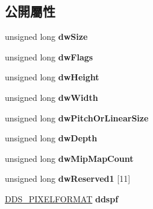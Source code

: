 \subsection*{公開屬性}
\begin{DoxyCompactItemize}
\item 
unsigned long {\bfseries dw\+Size}\hypertarget{struct_d_d_s___h_e_a_d_e_r_adcd66bcae56a4f70de87bd1a25650254}{}\label{struct_d_d_s___h_e_a_d_e_r_adcd66bcae56a4f70de87bd1a25650254}

\item 
unsigned long {\bfseries dw\+Flags}\hypertarget{struct_d_d_s___h_e_a_d_e_r_ae2e231f8e4f3b1f5968fa61dcbf1a758}{}\label{struct_d_d_s___h_e_a_d_e_r_ae2e231f8e4f3b1f5968fa61dcbf1a758}

\item 
unsigned long {\bfseries dw\+Height}\hypertarget{struct_d_d_s___h_e_a_d_e_r_a1d571cef49ca13e069ad326f63c59a3b}{}\label{struct_d_d_s___h_e_a_d_e_r_a1d571cef49ca13e069ad326f63c59a3b}

\item 
unsigned long {\bfseries dw\+Width}\hypertarget{struct_d_d_s___h_e_a_d_e_r_a6e372735f1272f0225a70a7f91234447}{}\label{struct_d_d_s___h_e_a_d_e_r_a6e372735f1272f0225a70a7f91234447}

\item 
unsigned long {\bfseries dw\+Pitch\+Or\+Linear\+Size}\hypertarget{struct_d_d_s___h_e_a_d_e_r_aafd89087e77854c55159e52714b45ba3}{}\label{struct_d_d_s___h_e_a_d_e_r_aafd89087e77854c55159e52714b45ba3}

\item 
unsigned long {\bfseries dw\+Depth}\hypertarget{struct_d_d_s___h_e_a_d_e_r_a032af0a73ed281d4558b8ce8cf0047c8}{}\label{struct_d_d_s___h_e_a_d_e_r_a032af0a73ed281d4558b8ce8cf0047c8}

\item 
unsigned long {\bfseries dw\+Mip\+Map\+Count}\hypertarget{struct_d_d_s___h_e_a_d_e_r_a73231142b63af5d8d1139439ca22ae99}{}\label{struct_d_d_s___h_e_a_d_e_r_a73231142b63af5d8d1139439ca22ae99}

\item 
unsigned long {\bfseries dw\+Reserved1} \mbox{[}11\mbox{]}\hypertarget{struct_d_d_s___h_e_a_d_e_r_a1b8a27ee32638d9ff7cf1c11cecd7201}{}\label{struct_d_d_s___h_e_a_d_e_r_a1b8a27ee32638d9ff7cf1c11cecd7201}

\item 
\hyperlink{struct_d_d_s___p_i_x_e_l_f_o_r_m_a_t}{D\+D\+S\+\_\+\+P\+I\+X\+E\+L\+F\+O\+R\+M\+AT} {\bfseries ddspf}\hypertarget{struct_d_d_s___h_e_a_d_e_r_a27445ea81444c05a620469f266bff154}{}\label{struct_d_d_s___h_e_a_d_e_r_a27445ea81444c05a620469f266bff154}


\end{DoxyCompactItemize}
